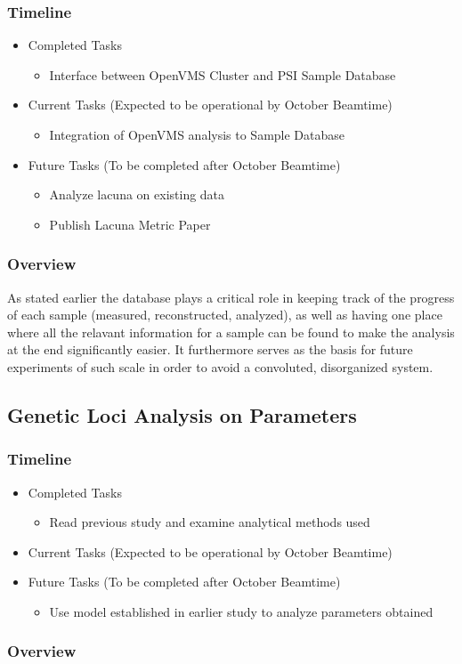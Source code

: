 \subsubsection*{Timeline}
\begin{itemize}
 	\item Completed Tasks
	\begin{itemize}
		\item Interface between OpenVMS Cluster and PSI Sample Database
	\end{itemize}
	\item Current Tasks (Expected to be operational by October Beamtime)
	\begin{itemize}
		\item Integration of OpenVMS analysis to Sample Database
	\end{itemize}
	\item Future Tasks (To be completed after October Beamtime)
	\begin{itemize}
		\item Analyze lacuna on existing data
		\item Publish Lacuna Metric Paper
	\end{itemize}
\end{itemize}
\subsubsection*{Overview}
As stated earlier the database plays a critical role in keeping track of the progress of each sample (measured, reconstructed, analyzed), as well as having one place where all the relavant information for a sample can be found to make the analysis at the end significantly easier. It furthermore serves as the basis for future experiments of such scale in order to avoid a convoluted, disorganized system.
\subsection{Genetic Loci Analysis on Parameters}
\subsubsection*{Timeline}
\begin{itemize}
 	\item Completed Tasks
	\begin{itemize}
		\item Read previous study and examine analytical methods used
	\end{itemize}
	\item Current Tasks (Expected to be operational by October Beamtime)
	\item Future Tasks (To be completed after October Beamtime)
	\begin{itemize}
		\item Use model established in earlier study to analyze parameters obtained
	\end{itemize}
\end{itemize}
\subsubsection*{Overview}